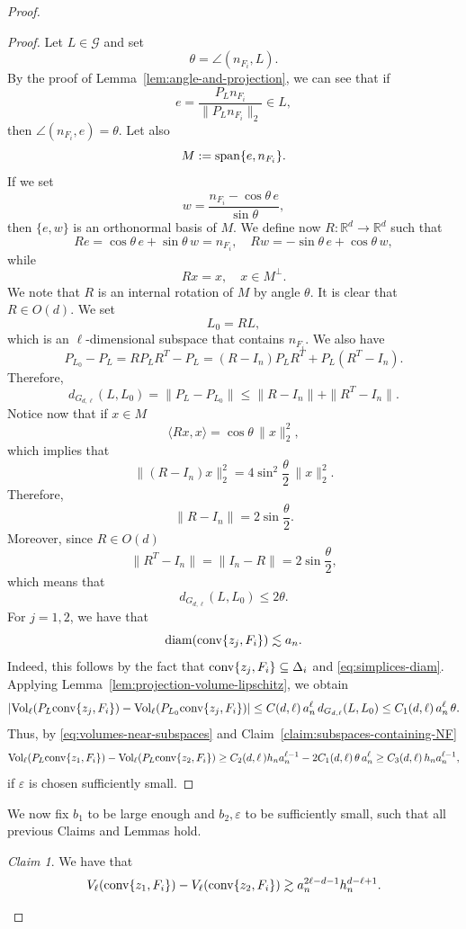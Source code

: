 \documentclass[10pt]{amsart}
\newcommand{\1}{\textbf{1}}
\newcommand{\conv}{{\rm conv}}
\newcommand{\vol}{{\rm Vol}}
\newcommand{\diam}{{\rm diam}}
\numberwithin{equation}{section} %
\theoremstyle{remark}
\newtheorem{claim}{Claim}
\theoremstyle{definition}
\begin{document}
\begin{proof}
     \begin{proof}
     Let $L \in \mathcal{G}$ and set \[\theta=\angle(n_{F_i},L).\] By the proof of Lemma~\ref{lem:angle-and-projection}, we can see that if \[e=\frac{P_Ln_{F_i}}{\|P_Ln_{F_i}\|_2} \in L,\] then $\angle(n_{F_i},e)=\theta$. Let also \[M:= {\rm span}\{e,n_{F_i}\}.\] If we set \[w=\frac{n_{F_i}-\cos\theta \,e}{\sin\theta},\] then $\{e,w\}$ is an orthonormal basis of $M$. We define now $R: \mathbb{R}^d \to \mathbb{R}^d$ such that \[Re=\cos\theta \, e+\sin\theta \, w=n_{F_i}, \quad Rw=-\sin \theta \, e+\cos\theta \, w,\] while \[Rx=x, \quad x \in M^\perp.\] We note that $R$ is an internal rotation of $M$ by angle $\theta$. It is clear that $R \in O(d)$. We set \[L_0 =RL,\] which is an $\ell$-dimensional subspace that contains $n_{F_i}$. We also have \[P_{L_0}-P_L=RP_LR^T-P_L=(R-I_n)P_LR^T+P_L(R^T-I_n).\] Therefore, \[d_{G_{d,\ell}}(L,L_0)=\|P_L-P_{L_0}\| \leq \|R-I_n\|+\|R^T-I_n\|.\] Notice now that if $x \in M$ \[\langle Rx,x\rangle =\cos\theta\,\|x\|_2^2,\] which implies that \[\|(R-I_n)x\|_2^2=4 \sin^2\frac{\theta}{2}\,\|x\|_2^2.\] Therefore, \[\|R-I_n\|=2\sin\frac{\theta}{2}.\] Moreover, since $R \in O(d)$ \[\|R^T-I_n\| =\|I_n-R\|=2\sin\frac{\theta}{2},\] which means that \[d_{G_{d,\ell}}(L,L_0) \leq 2\theta.\] For $j=1,2$, we have that \[\diam(\conv\{z_j,F_i\}) \lesssim a_n.\] Indeed, this follows by the fact that $\conv\{z_j,F_i\} \subseteq \Delta_i$ and \eqref{eq:simplices-diam}. Applying Lemma~\ref{lem:projection-volume-lipschitz}, we obtain \begin{equation}\label{eq:volumes-near-subspaces}|\vol_{\ell}(P_L \conv\{z_j,F_i\})-\vol_{\ell}(P_{L_0} \conv\{z_j,F_i\})| \leq C(d,\ell)\, a_n^{\ell}\,d_{G_{d,\ell}}(L,L_0) \leq C_1(d,\ell)\, a_n^\ell \,\theta.
     \end{equation} Thus, by \eqref{eq:volumes-near-subspaces} and Claim~\ref{claim:subspaces-containing-NF}
     \begin{equation*}
         \vol_{\ell}(P_{L} \conv\{z_1,F_i\}) - \vol_{\ell}(P_{L} \conv\{z_2,F_i\})\geq C_2(d,\ell\,)h_na_n^{\ell-1}-2C_1(d,\ell)\,\theta\, a_n^\ell \geq C_3(d,\ell)\,h_na_n^{\ell-1},
     \end{equation*}
         if $\varepsilon$ is chosen sufficiently small.
     \end{proof}

     We now fix $b_1$ to be large enough and $b_2,\varepsilon$ to be sufficiently small, such that all previous Claims and Lemmas hold.

\begin{claim}\label{claim:difference-integral-functionals}
   We have that \[V_\ell(\conv\{z_1,F_i\})-V_\ell(\conv\{z_2,F_i\}) \gtrsim a_n^{2\ell-d-1}h_n^{d-\ell+1}.
    \]
\end{claim}


\end{proof}
\end{document}
